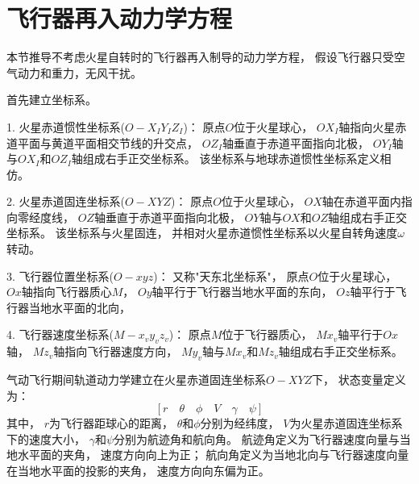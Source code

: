 \section{飞行器再入动力学方程}
本节推导不考虑火星自转时的飞行器再入制导的动力学方程，
假设飞行器只受空气动力和重力，无风干扰。

首先建立坐标系。

1. 火星赤道惯性坐标系($O-X_IY_IZ_I$)：
原点$O$位于火星球心，
$OX_I$轴指向火星赤道平面与黄道平面相交节线的升交点，
$OZ_I$轴垂直于赤道平面指向北极，
$OY_I$轴与$OX_I$和$OZ_I$轴组成右手正交坐标系。
该坐标系与地球赤道惯性坐标系定义相仿。

2. 火星赤道固连坐标系($O-XYZ$)：
原点$O$位于火星球心，
$OX$轴在赤道平面内指向零经度线，
$OZ$轴垂直于赤道平面指向北极，
$OY$轴与$OX$和$OZ$轴组成右手正交坐标系。
该坐标系与火星固连，
并相对火星赤道惯性坐标系以火星自转角速度$\omega$转动。

3. 飞行器位置坐标系($O-xyz$)：
又称"天东北坐标系"，
原点$O$位于火星球心，
$Ox$轴指向飞行器质心$M$，
$Oy$轴平行于飞行器当地水平面的东向，
$Oz$轴平行于飞行器当地水平面的北向，

4. 飞行器速度坐标系($M-x_vy_vz_v$)：
原点$M$位于飞行器质心，
$Mx_v$轴平行于$Ox$轴，
$Mz_v$轴指向飞行器速度方向，
$My_v$轴与$Mx_v$和$Mz_v$轴组成右手正交坐标系。

气动飞行期间轨道动力学建立在火星赤道固连坐标系$O-XYZ$下，
状态变量定义为：
\[[r\quad\theta\quad\phi\quad V\quad\gamma\quad\psi]\]
其中，
$r$为飞行器距球心的距离，
$\theta$和$\phi$分别为经纬度，
$V$为火星赤道固连坐标系下的速度大小，
$\gamma$和$\psi$分别为航迹角和航向角。
航迹角定义为飞行器速度向量与当地水平面的夹角，
速度方向向上为正；
航向角定义为当地北向与飞行器速度向量在当地水平面的投影的夹角，
速度方向向东偏为正。


